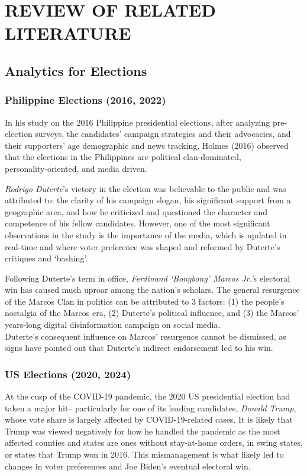 \chapter{REVIEW OF RELATED LITERATURE}

\section{Analytics for Elections}
\subsection{Philippine Elections (2016, 2022)}
In his study on the 2016 Philippine presidential elections, after analyzing pre-election surveys, the candidates' campaign strategies and their advocacies, and their supporters' age demographic and news tracking, Holmes (2016) observed that the elections in the Philippines are political clan-dominated, \\personality-oriented, and media driven.\cite{RRL_Holmes-2016}

\emph{Rodrigo Duterte}'s victory in the election was believable to the public and was attributed to: the clarity of his campaign slogan, his significant support from a geographic area, and how he criticized and questioned the character and competence of his fellow candidates. However, one of the most significant observations in the study is the importance of the media, which is updated in real-time and where voter preference was shaped and reformed by Duterte’s critiques and ‘bashing’.\cite{RRL_Holmes-2016}

Following Duterte’s term in office, \emph{Ferdinand ‘Bongbong’ Marcos Jr.’}s electoral win has caused much uproar among the nation’s scholars. The general resurgence of the Marcos Clan in politics can be attributed to 3 factors: (1) the people’s nostalgia of the Marcos era, (2) Duterte’s political influence, and (3) the Marcos’ years-long digital disinformation campaign on social media.\cite{RRL_Pernia-2025} \\Duterte’s consequent influence on Marcos’ resurgence cannot be dismissed, as signs have pointed out that Duterte’s indirect endorsement led to his win.\cite{RRL_Dulay-2023}

\subsection{US Elections (2020, 2024)}
At the cusp of the COVID-19 pandemic, the 2020 US presidential election had taken a major hit– particularly for one of its leading candidates, \emph{Donald Trump}, whose vote share is largely affected by COVID-19-related cases.\cite{RRL_Baccini-2021} It is likely that Trump was viewed negatively for how he handled the pandemic as the most affected counties and states are ones without stay-at-home orders, in swing states, or states that Trump won in 2016. This mismanagement is what likely led to changes in voter preferences and Joe Biden’s eventual electoral win.

